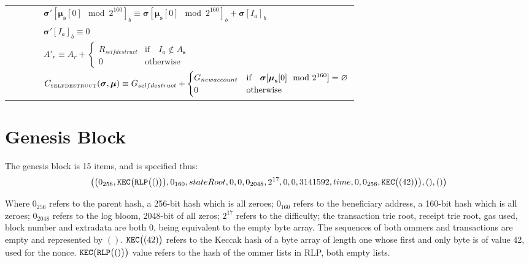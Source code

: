 \documentclass[9pt,oneside]{amsart}
\begin{document}
\begin{tabular*}{\columnwidth}[h]{rlrrl}
&&&& $\boldsymbol{\sigma}'[\boldsymbol{\mu}_\mathbf{s}[0] \mod 2^{160}]_b \equiv \boldsymbol{\sigma}[\boldsymbol{\mu}_\mathbf{s}[0] \mod 2^{160}]_b + \boldsymbol{\sigma}[I_a]_b$ \\
&&&& $\boldsymbol{\sigma}'[I_a]_b \equiv 0$ \\
&&&& $A'_{r} \equiv A_{r} + \begin{cases}
R_{selfdestruct} & \text{if} \quad I_a \notin A_\mathbf{s} \\
0 & \text{otherwise}
\end{cases}$ \\
&&&& $C_{\text{\tiny SELFDESTRUCT}}(\boldsymbol{\sigma}, \boldsymbol{\mu}) \equiv G_{selfdestruct} + \begin{cases}
G_{newaccount} & \text{if} \quad \boldsymbol{\sigma}[\boldsymbol{\mu}_\mathbf{s}[0] \mod 2^{160}] = \varnothing \\
0 & \text{otherwise}
\end{cases}$ \\
\bottomrule
\end{tabular*}


\section{Genesis Block}\label{app:genesis}

The genesis block is 15 items, and is specified thus:
\begin{equation}
\big( \big( 0_{256}, \mathtt{\tiny KEC}\big(\mathtt{\tiny RLP}\big( () \big)\big), 0_{160}, stateRoot, 0, 0, 0_{2048}, 2^{17}, 0, 0, 3141592, time, 0, 0_{256},  \mathtt{\tiny KEC}\big( (42) \big) \big), (), () \big)
\end{equation}

Where $0_{256}$ refers to the parent hash, a 256-bit hash which is all zeroes; $0_{160}$ refers to the beneficiary address, a 160-bit hash which is all zeroes; $0_{2048}$ refers to the log bloom, 2048-bit of all zeros; $2^{17}$ refers to the difficulty; the transaction trie root, receipt trie root, gas used, block number and extradata are both $0$, being equivalent to the empty byte array. The sequences of both ommers and transactions are empty and represented by $()$. $\mathtt{\tiny KEC}\big( (42) \big)$ refers to the Keccak hash of a byte array of length one whose first and only byte is of value 42, used for the nonce. $\mathtt{\tiny KEC}\big(\mathtt{\tiny RLP}\big( () \big)\big)$ value refers to the hash of the ommer lists in RLP, both empty lists.
\end{document}
